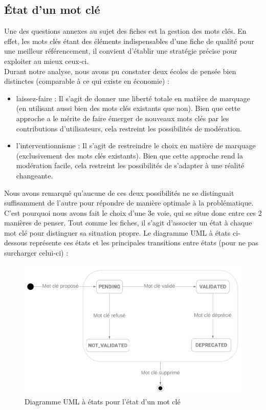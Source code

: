 \subsection*{État d'un mot clé}

Une des questions annexes au sujet des fiches est la gestion des mots clés. En effet, les mots clés étant des éléments indispensables d'une fiche de qualité pour une meilleur référencement, il convient d'établir une stratégie précise pour exploiter au mieux ceux-ci. \\

Durant notre analyse, nous avons pu constater deux écoles de pensée bien distinctes (comparable à ce qui existe en économie) : 
\begin{itemize}
    \item laissez-faire : Il s'agit de donner une liberté totale en matière de marquage (en utilisant aussi bien des mots clés existants que non). Bien que cette approche a le mérite de faire émerger de nouveaux mots clés par les contributions d'utilisateurs, cela restreint les possibilités de modération.
    \item l'interventionnisme : Il s'agit de restreindre le choix en matière de marquage (exclusivement des mots clés existants). Bien que cette approche rend la modération facile, cela restreint les possibilités de s'adapter à une réalité changeante.
\end{itemize}

Nous avons remarqué qu'aucune de ces deux possibilités ne se distinguait suffisamment de l'autre pour répondre de manière optimale à la problématique.
C'est pourquoi nous avons fait le choix d'une 3e voie, qui se situe donc entre ces 2 manières de penser. Tout comme les fiches, il s'agit d'associer un état à chaque mot clé pour distinguer sa situation propre. Le diagramme UML à états ci-dessous représente ces états et les principales transitions entre états (pour ne pas surcharger celui-ci) :

\begin{figure}[H]
    \includegraphics[width=\textwidth,height=\textheight,keepaspectratio]{images/StateTags.png}
    \centering
    \caption{Diagramme UML à états pour l'état d'un mot clé}
    \label{pic:stateDiagramForTags}
\end{figure}

